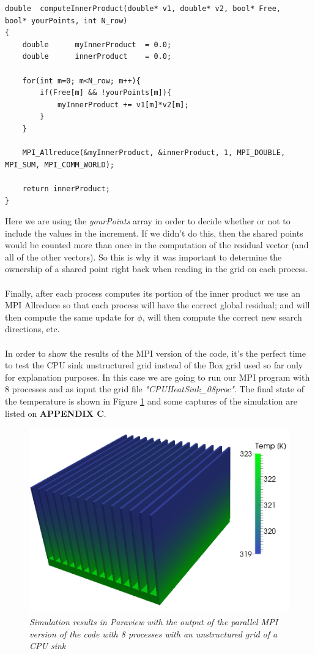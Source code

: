 \documentclass[12pt]{article}
\begin{document}
\begin{lstlisting}[style=MyC++Style]
double	computeInnerProduct(double* v1, double* v2, bool* Free, 
bool* yourPoints, int N_row)
{
	double		myInnerProduct	= 0.0;
	double		innerProduct	= 0.0;

	for(int m=0; m<N_row; m++){
		if(Free[m] && !yourPoints[m]){
			myInnerProduct += v1[m]*v2[m];
		}
	}

	MPI_Allreduce(&myInnerProduct, &innerProduct, 1, MPI_DOUBLE, MPI_SUM, MPI_COMM_WORLD);

	return innerProduct;
}
\end{lstlisting}

Here we are using the \textit{yourPoints} array in order to decide whether or not to include the values in the increment. If we didn't do this, then the shared points would be counted more than once in the computation of the residual vector (and all of the other vectors). So this is why it was important to determine the ownership of a shared point right back when reading in the grid on each process\cite{Steve13}.
\\\\
Finally, after each process computes its portion of the inner product we use an MPI Allreduce so that each process will have the correct global residual; and will then compute the same update for $\phi$, will then compute the correct new search
directions, etc.
\\\\
In order to show the results of the MPI version of the code, it's the perfect time to test the CPU sink unstructured grid instead of the Box grid used so far only for explanation purposes. In this case we are going to run our MPI program with 8 processes and as input the grid file \textit{"CPUHeatSink\_08proc"}. The final state of the temperature is shown in Figure \ref{fig:sink} and some captures of the simulation are listed on \textbf{APPENDIX C}.

	\begin{figure}[h!]
    \includegraphics[scale=0.3]{sink-MPI/heatSink_mpi_ts99.png}
    \centering
    \caption{\textit{Simulation results in Paraview with the output of the parallel MPI version of the code with 8 processes with an unstructured grid of a CPU sink}}
    \label{fig:sink}
	\end{figure}
\end{document}

